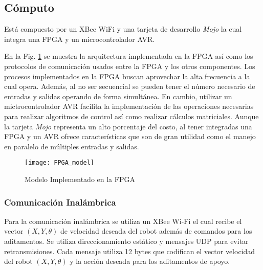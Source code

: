 \subsection{Cómputo}
Está compuesto por un XBee WiFi y una tarjeta de desarrollo \textit{Mojo} \cite{embedded_micro} la cual integra una \gls{FPGA} y un microcontrolador \gls{AVR}. 

En la Fig. \ref{fig:arq_fpga} se muestra la arquitectura implementada en la FPGA así como los protocolos de comunicación usados entre la FPGA y los otros componentes. Los procesos implementados en la FPGA buscan aprovechar la alta frecuencia a la cual opera. Además, al no ser secuencial se pueden tener el número necesario de entradas y salidas operando de forma simultánea. En cambio, utilizar un mictrocontrolador \gls{AVR} facilita la implementación de las operaciones necesarias para realizar algoritmos de control así como realizar cálculos matriciales.
Aunque la tarjeta \textit{Mojo} representa un alto porcentaje del costo, al tener integradas una \gls{FPGA} y un \gls{AVR} ofrece características que son de gran utilidad como el manejo en paralelo de múltiples entradas y salidas. 

\begin{figure}
	\centering
		\texttt{[image: FPGA\_model]}
	\caption{Modelo Implementado en la FPGA}
	\label{fig:arq_fpga}
\end{figure}
\subsubsection{Comunicación Inalámbrica}

Para la comunicación inalámbrica se utiliza un XBee \gls{Wi-Fi} el cual recibe el vector $(X, Y, \theta)$ de velocidad deseada del robot además de comandos para los aditamentos. Se utiliza direccionamiento estático y mensajes UDP para evitar retransmisiones. Cada mensaje utiliza 12 bytes que codifican el vector velocidad del robot $(X, Y, \theta)$ y la acción deseada para los aditamentos de apoyo.

